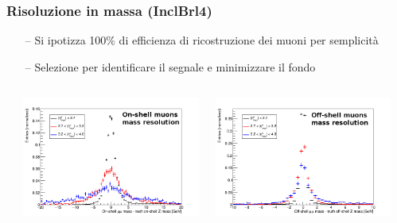\documentclass{beamer}
\begin{document}
\begin{frame}
\frametitle{Risoluzione in massa (InclBrl4)}
\begin{itemize}
\item[\color{black}--] \small Si ipotizza 100\% di efficienza di ricostruzione dei muoni per semplicit\`a
\item[\color{black}--] \small Selezione per identificare il segnale e minimizzare il fondo
\end{itemize}

\begin{columns}
\begin{column}{0.09\textwidth}
\end{column}
\begin{column}{0.41\textwidth}
\includegraphics[width=\textwidth]{HZZ4mu/sigRecoOnShellMass2}
\end{column}
\begin{column}{0.41\textwidth}
\includegraphics[width=\textwidth]{HZZ4mu/sigRecoOffShellMass2}
\end{column}
\begin{column}{0.09\textwidth}
\end{column}
\end{columns}
\vskip-0.1cm


\end{frame}
\end{document}
